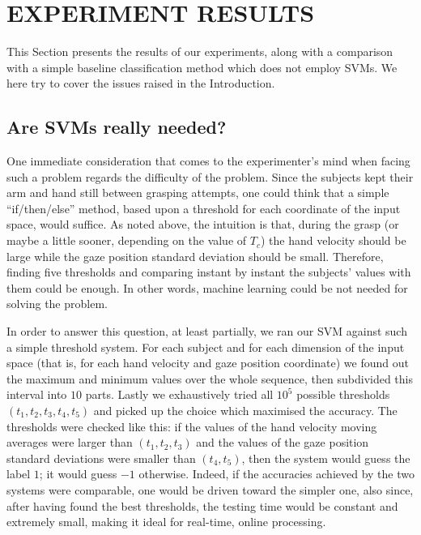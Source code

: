 \documentclass[a4paper,10pt,conference]{ieeeconf}
\begin{document}
\section{EXPERIMENT RESULTS}
\label{sec:res}

This Section presents the results of our experiments, along with a
comparison with a simple baseline classification method which does not
employ SVMs. We here try to cover the issues raised in the
Introduction.

\subsection{Are SVMs really needed?}

One immediate consideration that comes to the experimenter's mind when
facing such a problem regards the difficulty of the problem. Since the
subjects kept their arm and hand still between grasping attempts, one
could think that a simple ``if/then/else'' method, based upon a
threshold for each coordinate of the input space, would suffice. As
noted above, the intuition is that, during the grasp (or maybe a
little sooner, depending on the value of $T_c$) the hand velocity
should be large while the gaze position standard deviation should be
small. Therefore, finding five thresholds and comparing instant by
instant the subjects' values with them could be enough. In other
words, machine learning could be not needed for solving the problem.

In order to answer this question, at least partially, we ran our SVM
against such a simple threshold system. For each subject and for each
dimension of the input space (that is, for each hand velocity and gaze
position coordinate) we found out the maximum and minimum values over
the whole sequence, then subdivided this interval into $10$
parts. Lastly we exhaustively tried all $10^5$ possible thresholds
$(t_1,t_2,t_3,t_4,t_5)$ and picked up the choice which maximised the
accuracy. The thresholds were checked like this: if the values of the
hand velocity moving averages were larger than $(t_1,t_2,t_3)$ and the
values of the gaze position standard deviations were smaller than
$(t_4,t_5)$, then the system would guess the label $1$; it would guess
$-1$ otherwise. Indeed, if the accuracies achieved by the two systems
were comparable, one would be driven toward the simpler one, also
since, after having found the best thresholds, the testing time would
be constant and extremely small, making it ideal for real-time, online
processing.
\end{document}

